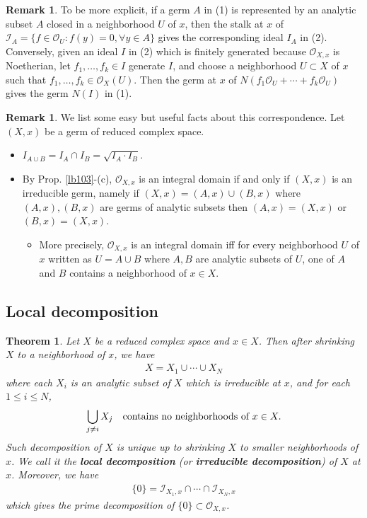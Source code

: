 \documentclass[12pt,b5paper,notitlepage]{report}
\theoremstyle{definition}
\newtheorem{rem}[df]{Remark}
\theoremstyle{plain}
\newtheorem{thm}[df]{Theorem}
\newcommand{\scr}{\mathscr}
\numberwithin{equation}{section}
\begin{document}
\begin{rem}
To be more explicit, if a germ $A$ in (1) is represented by an analytic subset $A$ closed in a neighborhood $U$ of $x$, then the stalk at $x$ of $\scr I_A=\{f\in\scr O_U:f(y)=0,\forall y\in A\}$ gives the corresponding ideal $I_A$ in (2). Conversely, given an ideal $I$ in (2) which is finitely generated because $\scr O_{X,x}$ is Noetherian, let $f_1,\dots,f_k\in I$ generate $I$, and choose a neighborhood $U\subset X$ of $x$ such that $f_1,\dots,f_k\in\scr O_X(U)$. Then the germ at $x$ of $N(f_1\scr O_U+\cdots+f_k\scr O_U)$ gives the germ $N(I)$ in (1).
\end{rem}




\begin{rem}\label{lb128}
We list some easy but useful facts about this correspondence. Let $(X,x)$ be a germ of reduced complex space.
\begin{itemize}
\item $I_{A\cup B}=I_A\cap I_B=\sqrt{I_A\cdot I_B}$.
\item By Prop. \ref{lb103}-(c), $\scr O_{X,x}$ is an integral domain if and only if $(X,x)$ is an irreducible germ, namely if $(X,x)=(A,x)\cup (B,x)$ where $(A,x),(B,x)$ are germs of analytic subsets then $(A,x)=(X,x)$ or $(B,x)=(X,x)$.
\begin{itemize}
\item More precisely, $\scr O_{X,x}$ is an integral domain iff for every neighborhood $U$ of $x$ written as $U=A\cup B$ where $A,B$ are analytic subsets of $U$, one of $A$ and $B$ contains a neighborhood of $x\in X$.
\end{itemize}
\end{itemize}
\end{rem}

\subsection{Local decomposition}


\begin{thm}\label{lb124}
Let $X$ be a reduced complex space and $x\in X$. Then after shrinking $X$ to a neighborhood of $x$, we have
\begin{align}
X=X_1\cup\cdots\cup X_N  \label{eq61}
\end{align}
where each $X_i$ is an analytic subset of $X$ which is irreducible at $x$, and for each $1\leq i\leq N$,
\begin{align}
\bigcup_{j\neq i}X_j\quad\textnormal{contains no neighborhoods of }x\in X.\label{eq62}
\end{align}
Such decomposition of $X$ is unique up to shrinking $X$ to smaller neighborhoods of $x$. We call it the \textbf{local decomposition} (or \textbf{irreducible decomposition}) of $X$ at $x$.  Moreover, we have
\begin{align}
\{0\}=\scr I_{X_1,x}\cap\cdots\cap\scr I_{X_N,x}  \label{eq63}
\end{align}
which gives the prime decomposition of $\{0\}\subset\scr O_{X,x}$.
\end{thm}
\end{document}
